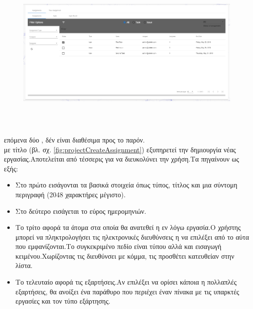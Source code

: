 \begin{figure}[!htb]
\includegraphics[width=\linewidth, height=8cm]{images/projectAssignmentsAssignments.png}
\caption{}
\label{fig:projectAssignmentsAssignments}
\end{figure}

 επόμενα δύο , δέν είναι διαθέσιμα προς το παρόν.\\

  με τίτλο  (βλ. σχ. \ref{fig:projectCreateAssignment}) εξυπηρετεί την δημιουργία νέας εργασίας.Αποτελείται από τέσσερις  για να διευκολύνει την χρήση.Τα  πηγαίνουν ως εξής:\\

\begin{itemize}
	\item Στο πρώτο εισάγονται τα βασικά στοιχεία όπως τύπος, τίτλος και μια σύντομη περιγραφή (2048 χαρακτήρες μέγιστο).
	\item Στο δεύτερο εισάγεται το εύρος ημερομηνιών.
	\item Το τρίτο αφορά τα άτομα στα οποία θα ανατεθεί η εν λόγω εργασία.Ο χρήστης μπορεί να πληκτρολογήσει τις ηλεκτρονικές διευθύνσεις η να επιλέξει από το αύτα που εμφανίζονται.Το συγκεκριμένο πεδίο είναι τύπου  αλλά και εισαγωγή κειμένου.Χωρίζοντας τις διευθύνσει με κόμμα, τις προσθέτει κατευθείαν στην λίστα.
	\item Το τελευταίο αφορά τις εξαρτήσεις.Αν επιλέξει να ορίσει κάποια η πολλαπλές εξαρτήσεις, θα ανοίξει ένα  παράθυρο που περιέχει έναν πίνακα με τις υπαρκτές εργασίες και τον τύπο εξάρτησης.
\end{itemize}

